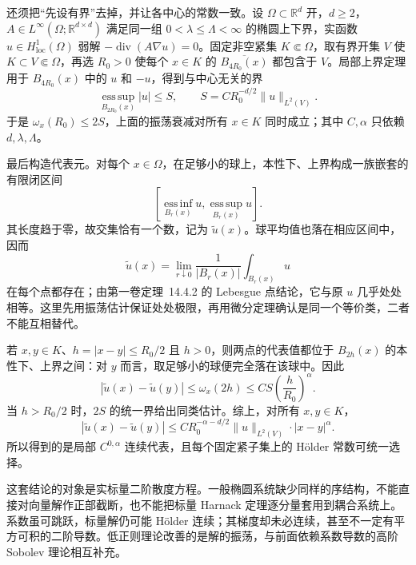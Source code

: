\ProseParagraphBreak

还须把“先设有界”去掉，并让各中心的常数一致。设 \(\Omega\subset\mathbb R^d\) 开，\(d\geq2\)，\(A\in L^\infty(\Omega;\mathbb R^{d\times d})\) 满足同一组 \(0<\lambda\leq\Lambda<\infty\) 的椭圆上下界，实函数 \(u\in H^1_{\mathrm{loc}}(\Omega)\) 弱解 \(-\operatorname{div}(A\nabla u)=0\)。固定非空紧集 \(K\Subset\Omega\)，取有界开集 \(V\) 使 \(K\subset V\Subset\Omega\)，再选 \(R_0>0\) 使每个 \(x\in K\) 的 \(\overline{B_{4R_0}(x)}\) 都包含于 \(V\)。局部上界定理用于 \(B_{4R_0}(x)\) 中的 \(u\) 和 \(-u\)，得到与中心无关的界
\[
 \operatorname*{ess\,sup}_{B_{2R_0}(x)}|u|
 \leq S,\qquad
 S=C R_0^{-d/2}\|u\|_{L^2(V)}.
\]
于是 \(\omega_x(R_0)\leq2S\)，上面的振荡衰减对所有 \(x\in K\) 同时成立；其中 \(C,\alpha\) 只依赖 \(d,\lambda,\Lambda\)。

最后构造代表元。对每个 \(x\in\Omega\)，在足够小的球上，本性下、上界构成一族嵌套的有限闭区间
\[
 \left[\operatorname*{ess\,inf}_{B_r(x)}u,
       \operatorname*{ess\,sup}_{B_r(x)}u\right].
\]
其长度趋于零，故交集恰有一个数，记为 \(\widetilde u(x)\)。球平均值也落在相应区间中，因而
\[\widetilde u(x)=\lim_{r\downarrow0}
       \frac1{|B_r(x)|}\int_{B_r(x)}u\]
在每个点都存在；由第一卷定理~14.4.2 的 Lebesgue 点结论，它与原 \(u\) 几乎处处相等。这里先用振荡估计保证处处极限，再用微分定理确认是同一个等价类，二者不能互相替代。

若 \(x,y\in K\)、\(h=|x-y|\leq R_0/2\) 且 \(h>0\)，则两点的代表值都位于 \(B_{2h}(x)\) 的本性下、上界之间：对 \(y\) 而言，取足够小的球便完全落在该球中。因此
\[
 |\widetilde u(x)-\widetilde u(y)|
 \leq\omega_x(2h)
 \leq C S\left(\frac{h}{R_0}\right)^\alpha.
\]
当 \(h>R_0/2\) 时，\(2S\) 的统一界给出同类估计。综上，对所有 \(x,y\in K\)，
\[
 |\widetilde u(x)-\widetilde u(y)|
 \leq C R_0^{-\alpha-d/2}\|u\|_{L^2(V)}
       \cdot|x-y|^\alpha.
\]
所以得到的是局部 \(C^{0,\alpha}\) 连续代表，且每个固定紧子集上的 Hölder 常数可统一选择。

\ProseParagraphBreak

这套结论的对象是实标量二阶散度方程。一般椭圆系统缺少同样的序结构，不能直接对向量解作正部截断，也不能把标量 Harnack 定理逐分量套用到耦合系统上。系数虽可跳跃，标量解仍可能 Hölder 连续；其梯度却未必连续，甚至不一定有平方可积的二阶导数。低正则理论改善的是解的振荡，与前面依赖系数导数的高阶 Sobolev 理论相互补充。
